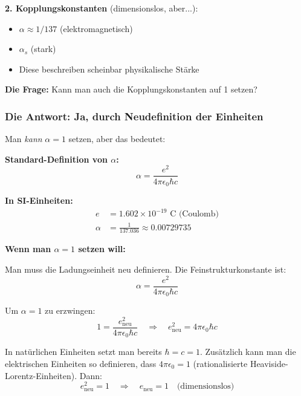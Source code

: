 \textbf{2. Kopplungskonstanten} (dimensionslos, aber...):
\begin{itemize}[nosep]
	\item $\alpha \approx 1/137$ (elektromagnetisch)
	\item $\alpha_s$ (stark)
	\item Diese beschreiben scheinbar physikalische Stärke
\end{itemize}

\textbf{Die Frage:} Kann man auch die Kopplungskonstanten auf 1 setzen?

\subsubsection{Die Antwort: Ja, durch Neudefinition der Einheiten}

Man \textit{kann} $\alpha = 1$ setzen, aber das bedeutet:

\textbf{Standard-Definition von $\alpha$:}
\begin{equation}
	\alpha = \frac{e^2}{4\pi\epsilon_0 \hbar c}
\end{equation}

\textbf{In SI-Einheiten:}
\begin{align}
	e &= 1.602 \times 10^{-19} \text{ C (Coulomb)} \\
	\alpha &= \frac{1}{137.036} \approx 0.00729735
\end{align}

\textbf{Wenn man $\alpha = 1$ setzen will:}

Man muss die Ladungseinheit neu definieren. Die Feinstrukturkonstante ist:
\begin{equation}
	\alpha = \frac{e^2}{4\pi\epsilon_0 \hbar c}
\end{equation}

Um $\alpha = 1$ zu erzwingen:
\begin{equation}
	1 = \frac{e_{\text{neu}}^2}{4\pi\epsilon_0 \hbar c} \quad \Rightarrow \quad e_{\text{neu}}^2 = 4\pi\epsilon_0 \hbar c
\end{equation}

In natürlichen Einheiten setzt man bereits $\hbar = c = 1$. Zusätzlich kann man die elektrischen Einheiten so definieren, dass $4\pi\epsilon_0 = 1$ (rationalisierte Heaviside-Lorentz-Einheiten). Dann:
\begin{equation}
	e_{\text{neu}}^2 = 1 \quad \Rightarrow \quad e_{\text{neu}} = 1 \quad \text{(dimensionslos)}
\end{equation}

